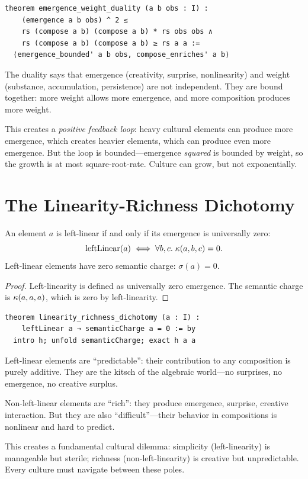 \begin{lstlisting}
theorem emergence_weight_duality (a b obs : I) :
    (emergence a b obs) ^ 2 ≤
    rs (compose a b) (compose a b) * rs obs obs ∧
    rs (compose a b) (compose a b) ≥ rs a a :=
  ⟨emergence_bounded' a b obs, compose_enriches' a b⟩
\end{lstlisting}

\begin{remark}
The duality says that emergence (creativity, surprise, nonlinearity)
and weight (substance, accumulation, persistence) are not independent.
They are bound together: more weight allows more emergence, and more
composition produces more weight.

This creates a \emph{positive feedback loop}: heavy cultural elements
can produce more emergence, which creates heavier elements, which can
produce even more emergence.  But the loop is bounded---emergence
\emph{squared} is bounded by weight, so the growth is at most
square-root-rate.  Culture can grow, but not exponentially.
\end{remark}

\section{The Linearity-Richness Dichotomy}

\begin{theorem}
\label{thm:dichotomy}
An element $a$ is left-linear if and only if its emergence is
universally zero:
\[
  \mathrm{leftLinear}(a) \iff \forall b, c.\; \kappa(a, b, c) = 0.
\]
Left-linear elements have zero semantic charge: $\sigma(a) = 0$.
\end{theorem}

\begin{proof}
Left-linearity is defined as universally zero emergence.
The semantic charge is $\kappa(a, a, a)$, which is zero by
left-linearity.
\end{proof}

\begin{lstlisting}
theorem linearity_richness_dichotomy (a : I) :
    leftLinear a → semanticCharge a = 0 := by
  intro h; unfold semanticCharge; exact h a a
\end{lstlisting}

\begin{interpretation}
Left-linear elements are ``predictable'': their contribution to any
composition is purely additive.  They are the kitsch of the algebraic
world---no surprises, no emergence, no creative surplus.

Non-left-linear elements are ``rich'': they produce emergence, surprise,
creative interaction.  But they are also ``difficult''---their behavior
in compositions is nonlinear and hard to predict.

This creates a fundamental cultural dilemma: simplicity (left-linearity)
is manageable but sterile; richness (non-left-linearity) is creative
but unpredictable.  Every culture must navigate between these poles.
\end{interpretation}


